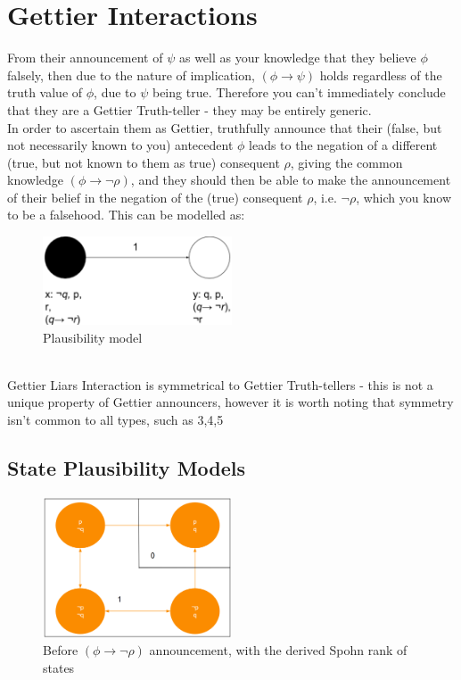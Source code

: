 \documentclass[12pt, titlepage, twoside, a4paper]{report}
\begin{document}
{\section{Gettier Interactions}
From their announcement of $\psi$ as well as your knowledge that they believe $\phi$ falsely, then due to the nature of implication, $(\phi \to \psi)$ holds regardless of the truth value of $\phi$, due to $\psi$ being true. Therefore you can't immediately conclude that they are a Gettier Truth-teller - they may be entirely generic.\\
In order to ascertain them as Gettier, truthfully announce that their (false, but not necessarily known to you) antecedent $\phi$ leads to the negation of a different (true, but not known to them as true) consequent $\rho$,  giving the common knowledge $(\phi \to \neg \rho)$, and they should then be able to make the announcement of their belief in the negation of the (true) consequent $\rho$, i.e. $\neg \rho$, which you know to be a falsehood. This can be modelled as:\\
\begin{figure}[h]
  \centering
  \includegraphics[width=0.5\textwidth]{gettiermodelbase.eps}
  \caption{Plausibility model}
\end{figure}\\
Gettier Liars Interaction is symmetrical to Gettier Truth-tellers - this is not a unique property  of Gettier announcers, however it is worth noting that symmetry isn't common to all types, such as 3,4,5

\subsection{State Plausibility Models}

\begin{figure}[h]
  \centering
  \includegraphics[width=0.5\textwidth]{slide19.eps}
  \caption{Before $(\phi \to \neg \rho)$ announcement, with the derived Spohn rank of states}
\end{figure}

}
\end{document}
